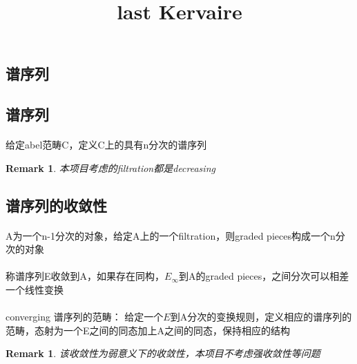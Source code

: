 \documentclass[12pt,a4paper]{article}
\title{last Kervaire}
\author{}
\newtheorem{rem}[equation]{Remark}
\begin{document}
\sffamily
\maketitle
\thispagestyle{empty}

\abstract{}
\tableofcontents

\large

\begin{sloppy}

\section{谱序列}
\subsection{谱序列}
\paragraph{}
给定abel范畴C，定义C上的具有n分次的谱序列

\begin{rem}
    本项目考虑的filtration都是decreasing
\end{rem}

\subsection{谱序列的收敛性}

\paragraph{}A为一个n-1分次的对象，给定A上的一个filtration，则graded pieces构成一个n分次的对象

\paragraph{}称谱序列E收敛到A，如果存在同构，$E_\infty$到A的graded pieces，之间分次可以相差一个线性变换

\paragraph{}converging 谱序列的范畴：
给定一个$E$到A分次的变换规则，定义相应的谱序列的范畴，态射为一个E之间的同态加上A之间的同态，保持相应的结构

\begin{rem}
    该收敛性为弱意义下的收敛性，本项目不考虑强收敛性等问题
\end{rem}


\end{sloppy}
\end{document}
